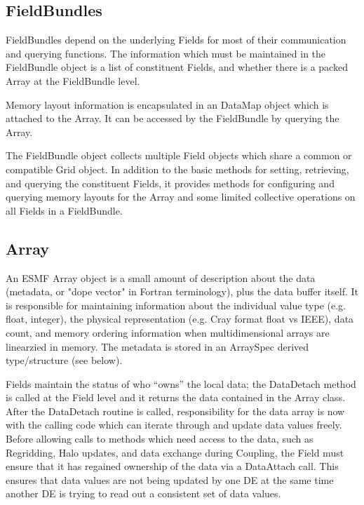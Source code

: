 \subsection{FieldBundles}

FieldBundles depend on the underlying Fields for most of their 
communication and querying functions.  The information which
must be maintained in the FieldBundle object is a list of constituent
Fields, and whether there is a packed Array at the FieldBundle level.

Memory layout information is encapsulated in an DataMap object which
is attached to the Array.  It can be accessed by the FieldBundle
by querying the Array.

The FieldBundle object collects multiple Field objects which share a
common or compatible Grid object.  In addition to the basic methods for
setting, retrieving, and querying the constituent Fields, it provides
methods for configuring and querying memory layouts for the Array
and some limited collective operations on all Fields in a FieldBundle.

\subsection{Array}

An ESMF Array object is a small amount of description about
the data (metadata, or "dope vector" in Fortran terminology), 
plus the data buffer itself.  It is 
responsible for maintaining
information about the individual value type (e.g. float, integer), 
the physical representation (e.g. Cray format float vs IEEE), 
data count, and memory ordering information when multidimensional
arrays are linearzied in memory.
The metadata is stored in an ArraySpec
derived type/structure (see below).

Fields maintain the status of who ``owns'' the local data;
the DataDetach method is called at the Field level and it
returns the data contained in the Array class.
After the DataDetach routine is called, responsibility for
the data array is now with the calling code which can iterate through
and update data values freely.  Before allowing calls to methods which need
access to the data, such as Regridding, Halo updates, and
data exchange during Coupling, the Field must ensure that it
has regained ownership of the data via a DataAttach call.  
This ensures that data values are not being updated by one
DE at the same time another DE is trying to read out a consistent
set of data values.


